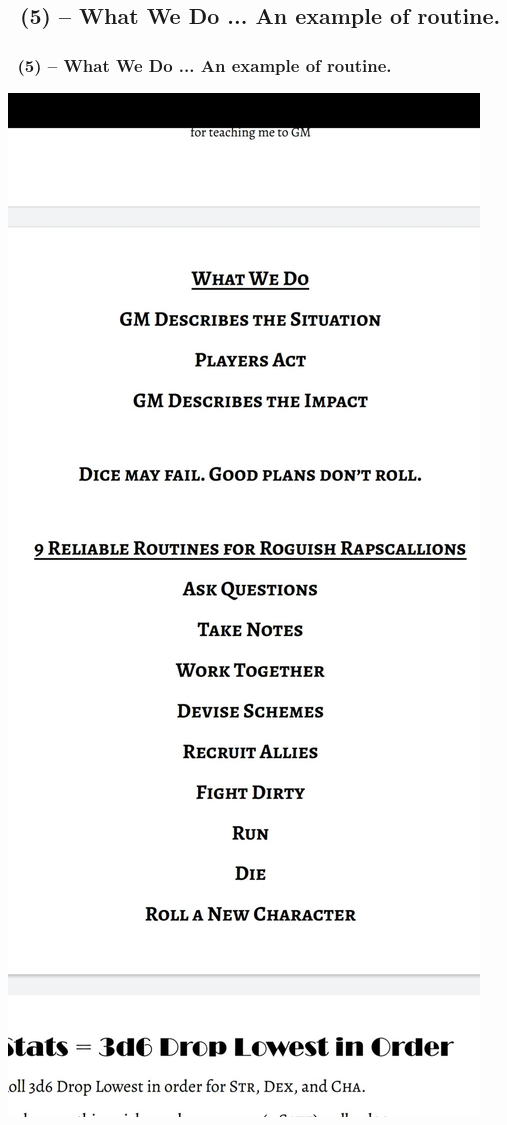 \documentclass[slidetop,11pt]{beamer}
\begin{document}
\subsection{ \subsectionTtitle~(5) -- What We Do ... An example of routine. }
\begin{frame}
	\frametitle{ \subsectionTtitle~(5) -- What We Do ... An example of routine. }
	\begin{center} 
		\includegraphics[height=0.95\textheight]{132926147-ad61d89d-4f36-48c8-acac-54cecfe960db.jpeg}
	\end{center} 
\end{frame}
\end{document}
